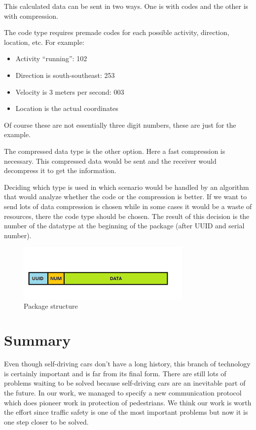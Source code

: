 \documentclass[conference]{IEEEtran}
\begin{document}
This calculated data can be sent in two ways. One is with codes and the other is with compression.

The code type requires premade codes for each possible activity, direction, location, etc.
For example:

\begin{itemize}
    \item Activity “running”: 102
    \item Direction is south-southeast: 253
    \item Velocity is 3 meters per second: 003
    \item Location is the actual coordinates
\end{itemize}

Of course these are not essentially three digit numbers, these are just for the example.

The compressed data type is the other option. Here a fast compression is necessary. This compressed data would be sent and the receiver would decompress it to get the information.

Deciding which type is used in which scenario would be handled by an algorithm that would analyze whether the code or the compression is better. If we want to send lots of data compression is chosen while in some cases it would be a waste of resources, there the code type should be chosen. The result of this decision is the number of the datatype at the beginning of the package (after UUID and serial number).

\begin{figure}[ht]
    \centering
    \includegraphics[width=8.5cm]{./pics/Package structure.png}
    \caption{Package structure}
\end{figure}

\section{Summary}
Even though self-driving cars don't have a long history, this branch of technology is certainly important and is far from its final form. There are still lots of problems waiting to be solved because self-driving cars are an inevitable part of the future. In our work, we managed to specify a new communication protocol which does pioneer work in protection of pedestrians. We think our work is worth the effort since traffic safety is one of the most important problems but now it is one step closer to be solved.
\end{document}
